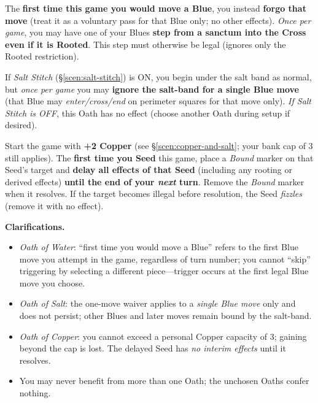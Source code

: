 \documentclass[11pt]{article}
\begin{document}
\begin{description}\setlength\itemsep{0.35em}
  \item[\textit{Oath of Water.}] The \textbf{first time this game you would move a Blue}, you instead \textbf{forgo that move} (treat it as a voluntary pass for that Blue only; no other effects). \emph{Once per game}, you may have one of your Blues \textbf{step from a sanctum into the Cross even if it is Rooted}. This step must otherwise be legal (ignores only the Rooted restriction).

  \item[\textit{Oath of Salt.}] If \emph{Salt Stitch} (\S\ref{scen:salt-stitch}) is \textsc{ON}, you begin under the salt band as normal, but \emph{once per game} you may \textbf{ignore the salt-band for a single Blue move} (that Blue may \emph{enter/cross/end} on perimeter squares for that move only). \emph{If Salt Stitch is \textsc{OFF}}, this Oath has no effect (choose another Oath during setup if desired).

  \item[\textit{Oath of Copper.}] Start the game with \textbf{+2 Copper} (see \S\ref{scen:copper-and-salt}; your bank cap of 3 still applies). The \textbf{first time you Seed} this game, place a \emph{Bound} marker on that Seed’s target and \textbf{delay all effects of that Seed} (including any rooting or derived effects) \textbf{until the end of your \emph{next} turn}. Remove the \emph{Bound} marker when it resolves. If the target becomes illegal before resolution, the Seed \emph{fizzles} (remove it with no effect).
\end{description}

\medskip
\noindent\textbf{Clarifications.}
\begin{itemize}\setlength\itemsep{0.25em}
  \item \textit{Oath of Water}: “first time you would move a Blue” refers to the first Blue move you attempt in the game, regardless of turn number; you cannot “skip” triggering by selecting a different piece—trigger occurs at the first legal Blue move you choose.
  \item \textit{Oath of Salt}: the one-move waiver applies to a \emph{single Blue move} only and does not persist; other Blues and later moves remain bound by the salt-band.
  \item \textit{Oath of Copper}: you cannot exceed a personal Copper capacity of 3; gaining beyond the cap is lost. The delayed Seed has \emph{no interim effects} until it resolves.
  \item You may never benefit from more than one Oath; the unchosen Oaths confer nothing.
\end{itemize}
\end{document}
